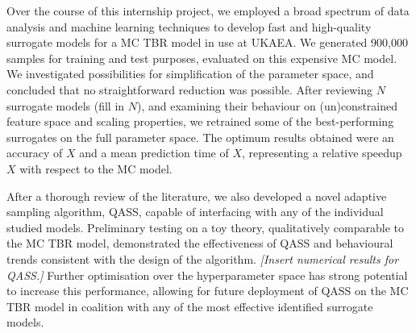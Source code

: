 Over the course of this internship project, we employed a broad spectrum of data analysis and machine learning techniques to develop fast and high-quality surrogate models for a MC TBR model in use at UKAEA. We generated 900,000 samples for training and test purposes, evaluated on this expensive MC model. We investigated possibilities for simplification of the parameter space, and concluded that no straightforward reduction was possible. After reviewing $N$ surrogate models (fill in $N$), and examining their behaviour on (un)constrained feature space and scaling properties, we retrained some of the best-performing surrogates on the full parameter space. The optimum results obtained were an accuracy of $X$ and a mean prediction time of $X$, representing a relative speedup $X$ with respect to the MC model.

After a thorough review of the literature, we also developed a novel adaptive sampling algorithm, QASS, capable of interfacing with any of the individual studied models. Preliminary testing on a toy theory, qualitatively comparable to the MC TBR model, demonstrated the effectiveness of QASS and behavioural trends consistent with the design of the algorithm. \textit{[Insert numerical results for QASS.]} Further optimisation over the hyperparameter space has strong potential to increase this performance, allowing for future deployment of QASS on the MC TBR model in coalition with any of the most effective identified surrogate models.

\newpage
